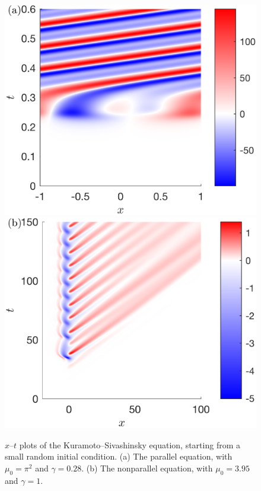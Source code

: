 \documentclass[11pt]{article}
\newcommand{\KSE}{Kuramoto--Sivashinsky equation}
\begin{document}
\begin{figure}
    \centering
    \includegraphics{xt_parallel}
    \hfill
    \includegraphics{xt_nonparallel}

    \caption{%
        $x$--$t$ plots of the \KSE, starting from a small random initial condition.
        (a) The parallel equation, with $\mu_0 = \pi^2$ and $\gamma = 0.28$.
        (b) The nonparallel equation, with $\mu_0 = 3.95$ and $\gamma = 1$.%
    }
    \label{fig:time-resolved}
\end{figure}
\end{document}
